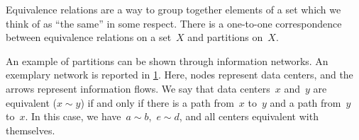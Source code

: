 \begin{remark}
  Equivalence relations are a way to group together elements of a set which we think of as ``the same'' in some respect. There is a one-to-one correspondence between equivalence relations on a set~$X$ and partitions on~$X$.
\end{remark}

\begin{example}
  An example of partitions can be shown through information networks.
  An exemplary network is reported in \cref{fig:info_network}.
  Here, nodes represent data centers, and the arrows represent information flows.
  We say that data centers~$x$ and~$y$ are equivalent ($x\sim y$) if and only if there is a path from~$x$ to~$y$ and a path from~$y$ to~$x$.
  In this case, we have~$a\sim b$,~$e\sim d$, and all centers equivalent with themselves.
\end{example}

\begin{figure}[h!]
  \begin{center}
  \end{center}
  \caption{}
  \label{fig:info_network}
\end{figure}
